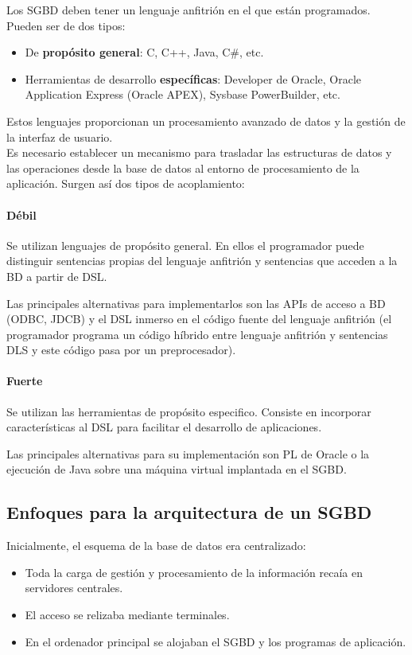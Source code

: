 \documentclass[12pt,spanish]{article}
\numberwithin{definition}{subsection}
\begin{document}
Los SGBD deben tener un lenguaje anfitrión en el que están programados. Pueden ser de dos tipos:

\begin{itemize}
	\item De \textbf{propósito general}: C, C++, Java, C\#, etc.
	\item Herramientas de desarrollo \textbf{específicas}: Developer de Oracle, Oracle Application Express (Oracle APEX), Sysbase PowerBuilder, etc.
\end{itemize}

Estos lenguajes proporcionan un procesamiento avanzado de datos y la gestión de la interfaz de usuario.\\

Es necesario establecer un mecanismo para trasladar las estructuras de datos y las operaciones desde la base de datos al entorno de procesamiento de la aplicación. Surgen así dos tipos de acoplamiento:

\paragraph{Débil}
Se utilizan lenguajes de propósito general. En ellos el programador puede distinguir sentencias propias del lenguaje anfitrión y sentencias que acceden a la BD a partir de DSL.

Las principales alternativas para implementarlos son las APIs de acceso a BD (ODBC, JDCB) y el DSL inmerso en el código fuente del lenguaje anfitrión (el programador programa un código híbrido entre lenguaje anfitrión y sentencias DLS y este código pasa por un preprocesador).
\paragraph{Fuerte}

Se utilizan las herramientas de propósito especifico. Consiste en incorporar características al DSL para facilitar el desarrollo de aplicaciones.

Las principales alternativas para su implementación son PL de Oracle o la ejecución de Java sobre una máquina virtual implantada en el SGBD.

\subsection{Enfoques para la arquitectura de un SGBD}

Inicialmente, el esquema de la base de datos era centralizado:
\begin{itemize}
	\item Toda la carga de gestión y procesamiento de la información recaía en servidores centrales.
	\item El acceso se relizaba mediante terminales.
	\item En el ordenador principal se alojaban el SGBD y los programas de aplicación.
\end{itemize}
\end{document}
